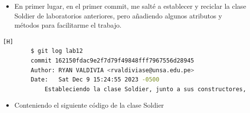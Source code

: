 \documentclass{article}
\begin{document}
	\begin{itemize}	
		\item En primer lugar, en el primer commit, me salté a establecer y reciclar la clase Soldier de laboratorios anteriores, pero añadiendo algunos atributos y métodos para facilitarme el trabajo.
	\end{itemize}	
	\begin{lstlisting}[language=bash,caption={Obteniendo la clase Soldado}][H]
		$ git log lab12
		commit 162150fdac9e2f7d79f49848fff7967556d28945
		Author: RYAN VALDIVIA <rvaldiviase@unsa.edu.pe>
		Date:   Sat Dec 9 15:24:55 2023 -0500
			Estableciendo la clase Soldier, junto a sus constructores, getters y setters
	\end{lstlisting}
	\begin{itemize}	
		\item Conteniendo el siguiente código de la clase Soldier
	\end{itemize}
\end{document}
